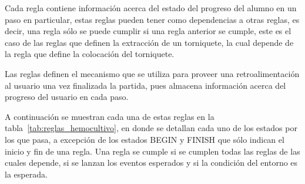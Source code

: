 Cada regla contiene información acerca del estado del progreso del alumno en un
paso en particular, estas reglas pueden tener como dependencias a otras reglas,
es decir, una regla sólo se puede cumplir si una regla anterior se cumple, este
es el caso de las reglas que definen la extracción de un torniquete, la cual
depende de la regla que define la colocación del torniquete.  

Las reglas definen el mecanismo que se utiliza para proveer una retroalimentación
al usuario una vez finalizada la partida, pues almacena información 
acerca del progreso del usuario en cada paso.

A continuación se muestran cada una de estas reglas en la
tabla~\ref{tab:reglas_hemocultivo}, en donde se detallan cada uno de los estados
por los que pasa, a excepción de los estados BEGIN y FINISH que sólo indican el
inicio y fin de una regla. Una regla se cumple si se cumplen todas las reglas de
las cuales depende, si se lanzan los eventos esperados y si la condición del
entorno es la esperada.


